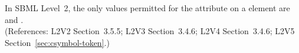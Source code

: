 In SBML Level~2, the only values permitted for the
 attribute on a  element are
 and
.\\
(References: L2V2 Section~3.5.5; L2V3 Section~3.4.6; L2V4 Section~3.4.6;
L2V5 Section~\ref{sec:csymbol-token}.)
